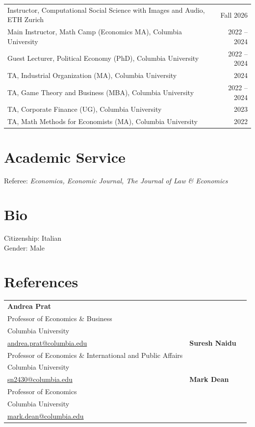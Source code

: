 \documentclass[10pt,letterpaper]{article}
\begin{document}
{
\begin{tabular*}{\linewidth}{@{}l@{\extracolsep{\fill}}r@{}}
Instructor, Computational Social Science with Images and Audio, ETH Zurich & Fall 2026\\[3pt]
Main Instructor, Math Camp (Economics MA), Columbia University & 2022 -- 2024\\[3pt]
Guest Lecturer, Political Economy (PhD), Columbia University & 2022 -- 2024\\[3pt]
TA, Industrial Organization (MA), Columbia University & 2024\\[3pt]
TA, Game Theory and Business (MBA), Columbia University & 2022 -- 2024\\[3pt]
TA, Corporate Finance (UG), Columbia University & 2023\\[3pt]
TA, Math Methods for Economists (MA), Columbia University & 2022
\end{tabular*}
}

\section*{Academic Service}

Referee: \textit{Economica, Economic Journal, The Journal of Law \& Economics}

\section*{Bio}

Citizenship: Italian \\
Gender: Male

\section*{References}

\setlength{\tabcolsep}{6pt}

\begin{tabular}{@{}p{\dimexpr(\linewidth-24pt)/3\relax}p{\dimexpr(\linewidth-24pt)/3\relax}p{\dimexpr(\linewidth-24pt)/3\relax}@{}}
\raggedright\textbf{Andrea Prat}\\
Professor of Economics \& Business\\
Columbia University\\
\href{mailto:andrea.prat@columbia.edu}{andrea.prat@columbia.edu}
&
\raggedright\textbf{Suresh Naidu}\\
Professor of Economics \& International and Public Affairs\\
Columbia University\\
\href{mailto:sn2430@columbia.edu}{sn2430@columbia.edu}
&
\raggedright\textbf{Mark Dean}\\
Professor of Economics\\
Columbia University\\
\href{mailto:mark.dean@columbia.edu}{mark.dean@columbia.edu}
\\
\end{tabular}
\end{document}
